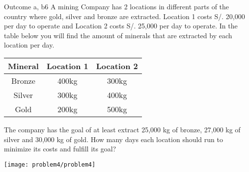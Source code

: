 \begin{problem}{Outcome a, b}{6}
    A mining Company has 2 locations in different parts of the country where gold, silver and bronze are extracted. Location 1 costs S/. 20,000 per day to operate and Location 2 costs S/. 25,000 per day to operate. In the table below you will find the amount of minerals that are extracted by each location per day.


    \begin{center}
        \begin{tabular}{ c|c|c } 
            \textbf{Mineral}  & \textbf{Location 1} & \textbf{Location 2} \\ \midrule  
            Bronze  & 400kg & 300kg \\
            Silver  & 300kg & 400kg \\ 
            Gold    & 200kg & 500kg \\ 
        \end{tabular}
        \newline
    \end{center}

    The company has the goal of at least extract 25,000 kg of bronze, 27,000 kg of silver and 30,000 kg of gold. How many days each location should run to minimize its costs and fulfill its goal?

    \begin{center}
        \texttt{[image: problem4/problem4]}%
    \end{center}

\end{problem}





